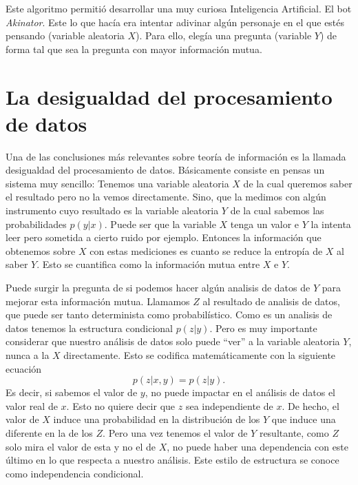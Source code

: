 Este algoritmo permiti\'o desarrollar una muy curiosa Inteligencia Artificial. El bot {\it Akinator}. Este lo que hac\'ia era intentar adivinar alg\'un personaje en el que est\'es pensando (variable aleatoria $X$). Para ello, eleg\'ia una pregunta (variable $Y$) de forma tal que sea la pregunta con mayor informaci\'on mutua.

\section{La desigualdad del procesamiento de datos}
Una de las conclusiones m\'as relevantes sobre teor\'ia de informaci\'on es la llamada desigualdad del procesamiento de datos. B\'asicamente consiste en pensas un sistema muy sencillo: Tenemos una variable aleatoria $X$ de la cual queremos saber el resultado pero no la vemos directamente. Sino, que la medimos con alg\'un instrumento cuyo resultado es la variable aleatoria $Y$ de la cual sabemos las probabilidades $p(y|x)$. Puede ser que la variable $X$ tenga un valor e $Y$ la intenta leer pero sometida a cierto ruido por ejemplo. Entonces la informaci\'on que obtenemos sobre $X$ con estas mediciones es cuanto se reduce la entrop\'ia de $X$ al saber $Y$. Esto se cuantifica como la informaci\'on mutua entre $X$ e $Y$.

Puede surgir la pregunta de si podemos hacer alg\'un analisis de datos de $Y$ para mejorar esta informaci\'on mutua. Llamamos $Z$ al resultado de analisis de datos, que puede ser tanto determinista como probabil\'istico. Como es un analisis de datos tenemos la estructura condicional $p(z|y)$. Pero es muy importante considerar que nuestro an\'alisis de datos solo puede ``ver'' a la variable aleatoria $Y$, nunca a la $X$ directamente. Esto se codifica matem\'aticamente con la siguiente ecuaci\'on
\begin{equation}
    p(z|x,y) = p(z|y).
    \label{3:eq:ind}
\end{equation}
Es decir, si sabemos el valor de $y$, no puede impactar en el an\'alisis de datos el valor real de $x$. Esto no quiere decir que $z$ sea independiente de $x$. De hecho, el valor de $X$ induce una probabilidad en la distribuci\'on de los $Y$ que induce una diferente en la de los $Z$. Pero una vez tenemos el valor de $Y$ resultante, como $Z$ solo mira el valor de esta y no el de $X$, no puede haber una dependencia con este \'ultimo en lo que respecta a nuestro an\'alisis. Este estilo de estructura se conoce como independencia condicional.

